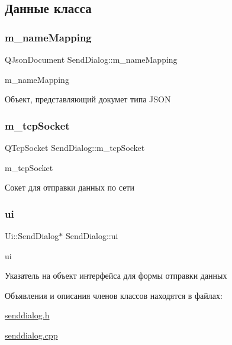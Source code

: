 \subsection{Данные класса}
\mbox{\label{classSendDialog_a51192da75f8dee9536f99c5b390d858f}} 
\subsubsection{\texorpdfstring{m\+\_\+name\+Mapping}{m\_nameMapping}}
{\footnotesize\ttfamily Q\+Json\+Document Send\+Dialog\+::m\+\_\+name\+Mapping\hspace{0.3cm}{\ttfamily [private]}}



m\+\_\+name\+Mapping 

Объект, представляющий докумет типа J\+S\+ON \mbox{\label{classSendDialog_a101575f24f58bbbbe03759c3602dcca3}} 
\subsubsection{\texorpdfstring{m\+\_\+tcp\+Socket}{m\_tcpSocket}}
{\footnotesize\ttfamily Q\+Tcp\+Socket Send\+Dialog\+::m\+\_\+tcp\+Socket\hspace{0.3cm}{\ttfamily [private]}}



m\+\_\+tcp\+Socket 

Сокет для отправки данных по сети \mbox{\label{classSendDialog_af3fd5ba452e7e546ebd1a3160c2333a9}} 
\subsubsection{\texorpdfstring{ui}{ui}}
{\footnotesize\ttfamily Ui\+::\+Send\+Dialog$\ast$ Send\+Dialog\+::ui\hspace{0.3cm}{\ttfamily [private]}}



ui 

Указатель на объект интерфейса для формы отправки данных 

Объявления и описания членов классов находятся в файлах\+:\begin{DoxyCompactItemize}
\item 
\hyperlink{senddialog_8h}{senddialog.\+h}\item 
\hyperlink{senddialog_8cpp}{senddialog.\+cpp}\end{DoxyCompactItemize}

